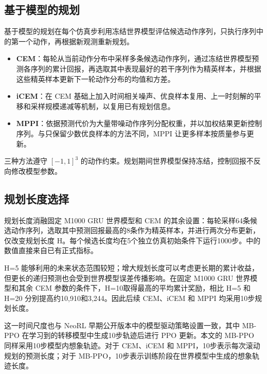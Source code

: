 \subsection{基于模型的规划}

基于模型的规划在每个仿真步利用冻结世界模型评估候选动作序列，只执行序列中的第一个动作，再根据新观测重新规划。

\begin{itemize}
  \item \textbf{CEM}：每轮从当前动作分布中采样多条候选动作序列，通过冻结世界模型预测各序列的累计回报，再选取其中表现最好的若干序列作为精英样本，并根据这些精英样本更新下一轮动作分布的均值和方差\cite{pinneri2021icem}。
  \item \textbf{iCEM}：在 CEM 基础上加入时间相关噪声、优良样本复用、上一时刻解的平移和采样规模递减等机制，以复用已有规划信息\cite{pinneri2021icem}。
  \item \textbf{MPPI}：依据预测代价为大量带噪动作序列分配权重，并以加权结果更新控制序列\cite{williams2017mppi}。与只保留少数优良样本的方法不同，MPPI 让更多样本按质量参与更新。
\end{itemize}

三种方法遵守 $[-1,1]^3$ 的动作约束。规划期间世界模型保持冻结，控制回报不反向修改模型参数。

\subsection{规划长度选择}
\label{sec:horizon_selection}

规划长度消融固定 M1000 GRU 世界模型和 CEM 的其余设置：每轮采样64条候选动作序列，选取其中预测回报最高的8条作为精英样本，并进行两次分布更新，仅改变规划长度 H。每个候选长度均在5个独立仿真初始条件下运行1000步。中的数值直接来自已有正式指标。



H=5 能够利用的未来状态范围较短；增大规划长度可以考虑更长期的累计收益，但更长的递归预测也会受到世界模型误差传播影响。在固定 M1000 GRU 世界模型和其余 CEM 参数的条件下，H=10取得最高的平均累计奖励，相比 H=5 和 H=20 分别提高约10,910和3,244。因此后续 CEM、iCEM 和 MPPI 均采用10步规划长度。

这一时间尺度也与 NeoRL 早期公开版本中的模型驱动策略设置一致，其中 MB-PPO 在学习到的转移模型中生成10步轨迹后进行 PPO 更新\cite{qin2021neorlpreprint}。本文的 MB-PPO 同样采用10步模型内想象轨迹。对于 CEM、iCEM 和 MPPI，10步表示每次滚动规划的预测长度；对于 MB-PPO，10步表示训练阶段在世界模型中生成的想象轨迹长度。


